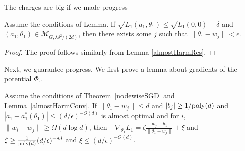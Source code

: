 The charges are big if we made progress
%
\begin{lemma}\label{nodeRes}
  Assume the conditions of Lemma. If
$\sqrt{L_1(a_1,\theta_1)} \leq \sqrt{L_1(0, 0)} - \delta$
  and $(a_1,\theta_1) \in \mathcal{M}_{G,\lambda \delta^2/(2d)}$,
  then there exists some $j$ such that $\|\theta_1 - w_j\| <\epsilon$.
\end{lemma}

\begin{proof}
The proof follows similarly from Lemma \ref{almostHarmRes}.
\end{proof}
 Next, we guarantee progress. We first prove a lemma about gradients of the potential $\Phi_\epsilon$.

\begin{lemma}\label{nodeGradient}
Assume the conditions of Theorem~\ref{nodewiseSGD} and Lemma~\ref{almostHarmConv}. If $\|\theta_1 - w_j\| \leq d$ and $|b_j|\geq 1/\mathrm{poly}(d)$ and $|a_1 - a_1^*(\theta_1)| \leq (d/\epsilon)^{-O(d)}$ is almost optimal and for $i$, $\|w_i - w_j\| \geq \Omega(d \log d)$, then $-\nabla_{\theta_1}L_1 = \zeta \frac{w_j - \theta_1}{\|\theta_1 - w_j\|} + \xi$ and $\zeta \geq  \frac{1}{\mathrm{poly}(d)}(d/\epsilon)^{-8d}$ and $\xi \leq (d/\epsilon)^{-O(d)}$. 
\end{lemma}

